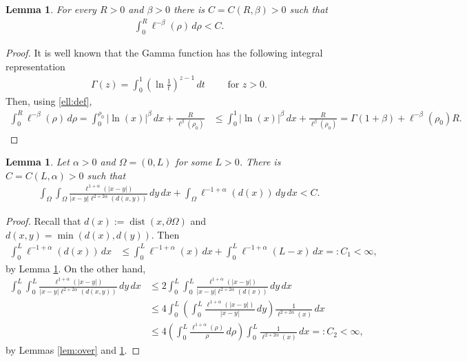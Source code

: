 \documentclass[11 pt]{article}
\newtheorem{lemma}[theorem]{Lemma}
\numberwithin{equation}{section}
\def\dist{\operatorname{dist}}
\begin{document}
\begin{lemma}\label{lem:ellbeta}
For every $R>0$ and $\beta>0$ there is $C=C(R,\beta)>0$ such that
\begin{align*}
\int_0^R \ell^{-\beta}(\rho)\, d\rho<C.
\end{align*}
\end{lemma}
\begin{proof}
 It is well known that the Gamma function has the following integral representation
 \begin{align*}
     \Gamma(z)=\int_0^1\left(\ln \frac{1}{t}\right)^{z-1}\, dt\qquad \text{ for }z>0.
 \end{align*}
Then, using \eqref{ell:def},
\begin{align*}
\int_0^R \ell^{-\beta}(\rho)\,d\rho
=
\int_0^{\rho_0} |\ln(x)|^{\beta}\,dx
+
\frac{R}{\ell^{\beta}(\rho_0)}
&\leq 
\int_0^{1} |\ln(x)|^{\beta}\,dx
+
\frac{R}{\ell^{\beta}(\rho_0)}=\Gamma(1+\beta)+\ell^{-\beta}(\rho_0)R.
\end{align*}
\end{proof}


\begin{lemma}\label{lem:int:bds}
Let $\alpha>0$ and $\Omega=(0,L)$ for some $L>0$. There is $C=C(L,\alpha)>0$ such that 
\begin{align*}
\int_{\Omega}\int_{\Omega}\frac{\ell^{1+\alpha}(|x-y|)}{|x-y|\ell^{2+2\alpha}(d(x,y))}\,dy\, dx+ \int_{\Omega}\ell^{-1+\alpha}(d(x))\, dy\,dx<C.
\end{align*}
\end{lemma}
\begin{proof}
Recall that $d(x):=\dist(x,\partial \Omega)$ and $d(x,y)=\min(d(x),d(y)).$ Then
\begin{align*}
\int_0^L \ell^{-1+\alpha}(d(x))\,dx&\leq \int_0^L \ell^{-1+\alpha}(x)\,dx+\int_0^L \ell^{-1+\alpha}(L-x)\,dx=:C_1<\infty,
\end{align*}
by Lemma \ref{lem:ellbeta}. On the other hand,
\begin{align*}
\int_0^L\int_0^L\frac{\ell^{1+\alpha}(|x-y|)}{|x-y|\ell^{2+2\alpha}(d(x,y))}\,dy\, dx
&\leq 2\int_0^L\int_0^L\frac{\ell^{1+\alpha}(|x-y|)}{|x-y|\ell^{2+2\alpha}(d(x))}\,dy\, dx\\
&\leq 4\int_0^L\left(\int_0^L\frac{\ell^{1+\alpha}(|x-y|)}{|x-y|}\,dy\right)\frac{1}{\ell^{2+2\alpha}(x)}\, dx\\
&\leq 4\left(\int_0^L\frac{\ell^{1+\alpha}(\rho)}{\rho}\,d\rho\right)\int_0^L\frac{1}{\ell^{2+2\alpha}(x)}\, dx=:C_2<\infty,
\end{align*}
by Lemmas \ref{lem:over} and \ref{lem:ellbeta}.
\end{proof}
\end{document}
